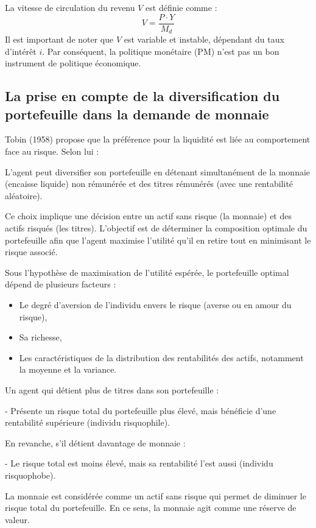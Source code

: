 \documentclass[a4paper, 12pt]{report}
\begin{document}
La vitesse de circulation du revenu \( V \) est définie comme :
\[
V = \frac{P \cdot Y}{M_d}
\]
Il est important de noter que \( V \) est variable et instable, dépendant du taux d'intérêt \( i \). Par conséquent, la politique monétaire (PM) n'est pas un bon instrument de politique économique.

\subsection{La prise en compte de la diversification du portefeuille dans la demande de monnaie}
	
Tobin (1958) propose que la préférence pour la liquidité est liée au comportement face au risque. Selon lui :

L'agent peut diversifier son portefeuille en détenant simultanément de la monnaie (encaisse liquide) non rémunérée et des titres rémunérés (avec une rentabilité aléatoire).

Ce choix implique une décision entre un actif sans risque (la monnaie) et des actifs risqués (les titres). L'objectif est de déterminer la composition optimale du portefeuille afin que l'agent maximise l'utilité qu'il en retire tout en minimisant le risque associé.

Sous l'hypothèse de maximisation de l'utilité espérée, le portefeuille optimal dépend de plusieurs facteurs :
\begin{itemize}
	\item Le degré d'aversion de l'individu envers le risque (averse ou en amour du risque),
	\item Sa richesse,
	\item Les caractéristiques de la distribution des rentabilités des actifs, notamment la moyenne et la variance.
\end{itemize}

Un agent qui détient plus de titres dans son portefeuille :

- Présente un risque total du portefeuille plus élevé, mais bénéficie d'une rentabilité supérieure (individu risquophile).

En revanche, s'il détient davantage de monnaie :

- Le risque total est moins élevé, mais sa rentabilité l'est aussi (individu risquophobe). 

La monnaie est considérée comme un actif sans risque qui permet de diminuer le risque total du portefeuille. En ce sens, la monnaie agit comme une réserve de valeur.
\end{document}
